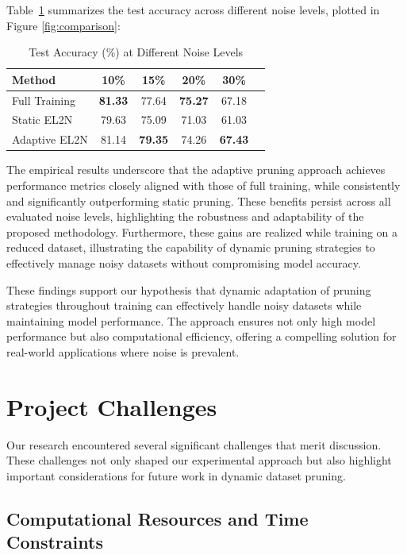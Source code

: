 \documentclass{article}
\begin{document}
Table~\ref{tab:results} summarizes the test accuracy across different noise levels, plotted in Figure \ref{fig:comparison}:

\begin{table}[h]
\caption{Test Accuracy (\%) at Different Noise Levels}
\label{tab:results}
\centering
\begin{tabular}{lccccc}
\toprule
Method & 10\% & 15\% & 20\% & 30\% \\
\midrule
Full Training & \textbf{81.33} & 77.64 & \textbf{75.27} & 67.18 \\
Static EL2N & 79.63 & 75.09 & 71.03 & 61.03 \\
Adaptive EL2N & 81.14 & \textbf{79.35} & 74.26 & \textbf{67.43} \\
\bottomrule
\end{tabular}
\end{table}

The empirical results underscore that the adaptive pruning approach achieves performance metrics closely aligned with those of full training, while consistently and significantly outperforming static pruning. These benefits persist across all evaluated noise levels, highlighting the robustness and adaptability of the proposed methodology. Furthermore, these gains are realized while training on a reduced dataset, illustrating the capability of dynamic pruning strategies to effectively manage noisy datasets without compromising model accuracy.

These findings support our hypothesis that dynamic adaptation of pruning strategies throughout training can effectively handle noisy datasets while maintaining model performance. The approach ensures not only high model performance but also computational efficiency, offering a compelling solution for real-world applications where noise is prevalent.

\section{Project Challenges}

Our research encountered several significant challenges that merit discussion. These challenges not only shaped our experimental approach but also highlight important considerations for future work in dynamic dataset pruning.

\subsection{Computational Resources and Time Constraints}
\end{document}
